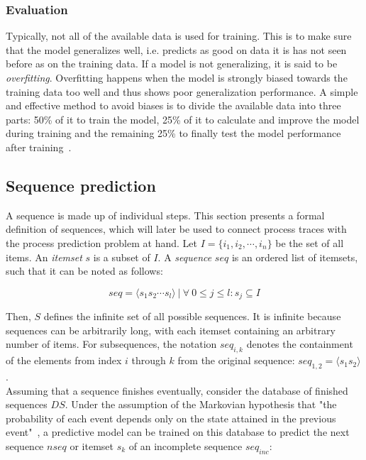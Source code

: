 \subsubsection*{Evaluation}
Typically, not all of the available data is used for training. This is to make sure that the model generalizes well, i.e. predicts as good on data it is has not seen before as on the training data. If a model is not generalizing, it is said to be \textit{overfitting}. Overfitting happens when the model is strongly biased towards the training data too well and thus shows poor generalization performance. A simple and effective method to avoid biases is to divide the available data into three parts: 50\% of it to train the model, 25\% of it to calculate and improve the model during training and the remaining 25\% to finally test the model performance after training~\cite{kuhn2013applied, trevor2009elements}.

\subsection{Sequence prediction}\label{sec:sequence-prediction}
A sequence is made up of individual steps. This section presents a formal definition of sequences, which will later be used to connect process traces with the process prediction problem at hand. Let $I = \{i_1, i_2, \cdots, i_n\}$ be the set of all items. An \textit{itemset} $s$ is a subset of $I$. A \textit{sequence} $seq$ is an ordered list of itemsets, such that it can be noted as follows:

$$seq = \langle s_1s_2\cdots s_l \rangle\ |\ \forall\ 0 \leq j \leq l: s_j \subseteq I$$

Then, $S$ defines the infinite set of all possible sequences. It is infinite because sequences can be arbitrarily long, with each itemset containing an arbitrary number of items. For  subsequences, the notation $seq_{i,k}$ denotes the containment of the elements from index $i$ through $k$ from the original sequence: $seq_{1,2} = \langle s_1s_2 \rangle$.\\

Assuming that a sequence finishes eventually, consider the database of finished sequences $DS$. Under the assumption of the Markovian hypothesis that "the probability of each event depends only on the state attained in the previous event"~\cite{gagniuc2017markov}, a predictive model can be trained on this database to predict the next sequence $nseq$ or itemset $s_k$ of an incomplete sequence $seq_{inc}$:

